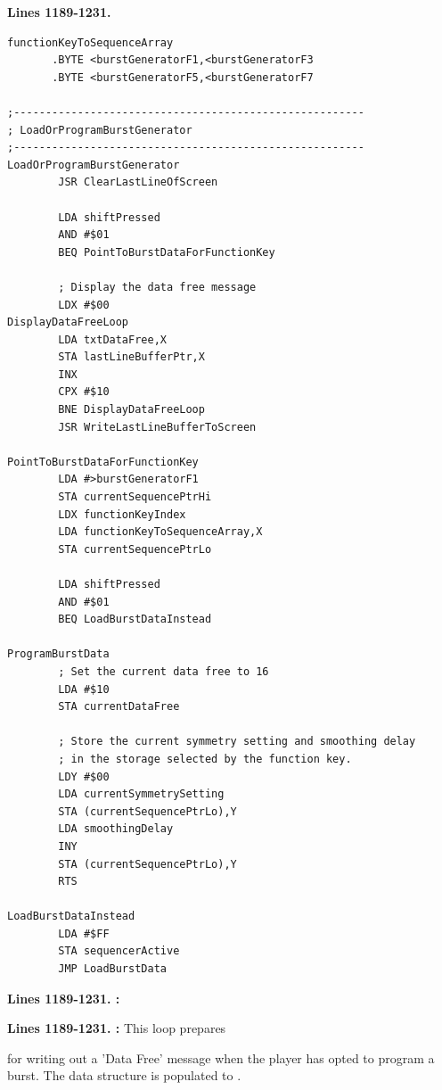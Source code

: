\clearpage
\textbf{Lines 1189-1231. }
\begin{lstlisting}[basicstyle=\ttfamily\scriptsize]
functionKeyToSequenceArray
       .BYTE <burstGeneratorF1,<burstGeneratorF3
       .BYTE <burstGeneratorF5,<burstGeneratorF7

;-------------------------------------------------------
; LoadOrProgramBurstGenerator
;-------------------------------------------------------
LoadOrProgramBurstGenerator   
        JSR ClearLastLineOfScreen

        LDA shiftPressed
        AND #$01
        BEQ PointToBurstDataForFunctionKey

        ; Display the data free message
        LDX #$00
DisplayDataFreeLoop   
        LDA txtDataFree,X
        STA lastLineBufferPtr,X
        INX 
        CPX #$10
        BNE DisplayDataFreeLoop
        JSR WriteLastLineBufferToScreen

PointToBurstDataForFunctionKey   
        LDA #>burstGeneratorF1
        STA currentSequencePtrHi
        LDX functionKeyIndex
        LDA functionKeyToSequenceArray,X
        STA currentSequencePtrLo

        LDA shiftPressed
        AND #$01
        BEQ LoadBurstDataInstead

ProgramBurstData
        ; Set the current data free to 16
        LDA #$10
        STA currentDataFree

        ; Store the current symmetry setting and smoothing delay
        ; in the storage selected by the function key. 
        LDY #$00
        LDA currentSymmetrySetting
        STA (currentSequencePtrLo),Y
        LDA smoothingDelay
        INY 
        STA (currentSequencePtrLo),Y
        RTS 

LoadBurstDataInstead
        LDA #$FF
        STA sequencerActive
        JMP LoadBurstData

\end{lstlisting}
\clearpage

\textbf{Lines 1189-1231. :} 

\textbf{Lines 1189-1231. :} This loop prepares 
\begin{figure}
%
\end{figure}
for writing out a 'Data Free' message when the player has opted to program a burst. The data structure
 is populated to .

